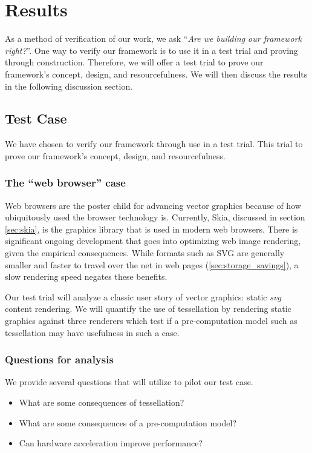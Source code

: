 \section{Results}\label{sec:results}
As a method of verification of our work, we ask ``\textit{Are we building our framework right?}''. One way to verify our framework is to use it in a test trial and proving through construction. Therefore, we will offer a test trial to prove our framework's concept, design, and resourcefulness. We will then discuss the results in the following discussion section.

\subsection{Test Case}\label{sec:test_case}
We have chosen to verify our framework through use in a test trial. This trial to prove our framework's concept, design, and resourcefulness.

\subsubsection{The ``web browser'' case}\label{sec:web_browser_case}
Web browsers are the poster child for advancing vector graphics because of how ubiquitously used the browser technology is. Currently, Skia, discussed in section \cref{sec:skia}, is the graphics library that is used in modern web browsers. There is significant ongoing development that goes into optimizing web image rendering, given the empirical consequences. While formats such as SVG are generally smaller and faster to travel over the net in web pages (\cref{sec:storage_savings}), a slow rendering speed negates these benefits.\medskip

Our test trial will analyze a classic user story of vector graphics: static \textit{svg} content rendering. We will quantify the use of tessellation by rendering static graphics against three renderers which test if a pre-computation model such as tessellation may have usefulness in such a case.

\subsubsection{Questions for analysis}
We provide several questions that \toollinkedname will utilize to pilot our test case.
\begin{itemize}
    \item What are some consequences of tessellation?
    \item What are some consequences of a pre-computation model?
    \item Can hardware acceleration improve performance?
\end{itemize}

